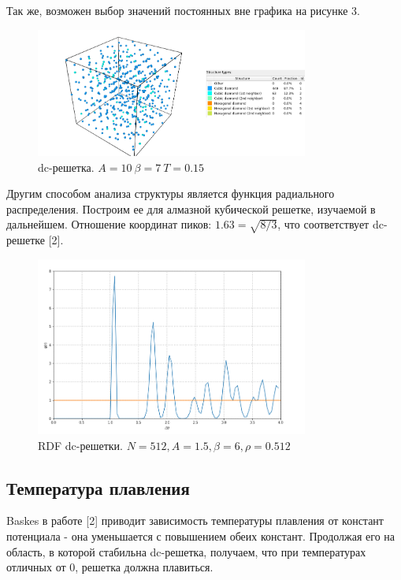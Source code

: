 \documentclass[12pt]{article}
\begin{document}
Так же, возможен выбор значений постоянных вне графика на рисунке 3. 

\begin{figure}[h]
\centering
\includegraphics[width=0.8\textwidth]{bc10_all}
\caption{dc-решетка. $A=10 \ \beta=7 \ T=0.15$}
\end{figure}
\FloatBarrier

Другим способом анализа структуры является функция радиального распределения. Построим ее для алмазной кубической решетке, изучаемой в дальнейшем. Отношение координат пиков: $1.63 = \sqrt{8/3}$, что соответствует dc-решетке [2]. 

\begin{figure}[h]
\centering
\includegraphics[width=0.80\textwidth]{radial}
\caption{RDF dc-решетки. $N=512, A=1.5, \beta=6, \rho=0.512$}
\end{figure}
\FloatBarrier

\newpage
\subsection{Температура плавления}

Baskes в работе [2] приводит зависимость температуры плавления от констант потенциала - она уменьшается с повышением обеих констант. Продолжая его на область, в которой стабильна dc-решетка, получаем, что при температурах отличных от 0, решетка должна плавиться.
\end{document}
